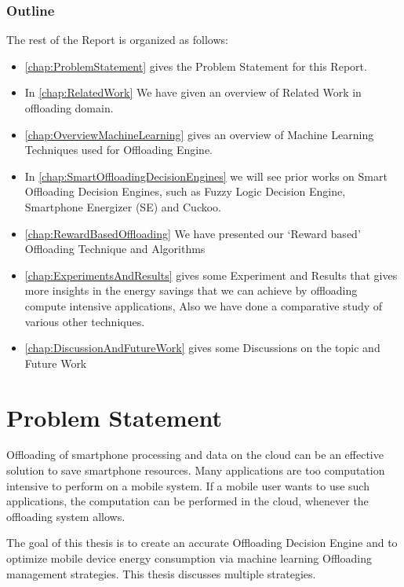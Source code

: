 \documentclass[12pt]{report}
\begin{document}
\subsection{Outline}
The rest of the Report is organized as follows:
\begin{itemize}
	
	\item \autoref{chap:ProblemStatement} gives the Problem Statement for this Report.
	\item In \autoref{chap:RelatedWork} We have given an overview of Related Work in offloading domain.
	\item \autoref{chap:OverviewMachineLearning} gives an overview of Machine Learning Techniques used for Offloading Engine.
	\item In \autoref{chap:SmartOffloadingDecisionEngines} we will see prior works on Smart Offloading Decision Engines, such as Fuzzy Logic Decision Engine, Smartphone Energizer (SE) and Cuckoo.
	\item \autoref{chap:RewardBasedOffloading} We have presented our `Reward based' Offloading Technique and Algorithms
	\item \autoref{chap:ExperimentsAndResults} gives some Experiment and Results that gives more insights in the energy savings that we can achieve by offloading compute intensive applications, Also we have done a comparative study of various other techniques.
	\item \autoref{chap:DiscussionAndFutureWork} gives some Discussions on the topic and Future Work

\end{itemize}
\chapter{Problem Statement} %
\label{chap:ProblemStatement}

Offloading of smartphone processing and data on the cloud can be an effective solution to save smartphone resources. Many applications are too computation intensive to perform on a mobile system. If a mobile user wants to use
such applications, the computation can be performed in the cloud, whenever the offloading system allows.

The goal of this thesis is to create an accurate Offloading Decision Engine and to optimize
mobile device energy consumption via machine learning Offloading management strategies.
This thesis discusses multiple strategies. 
\end{document}
